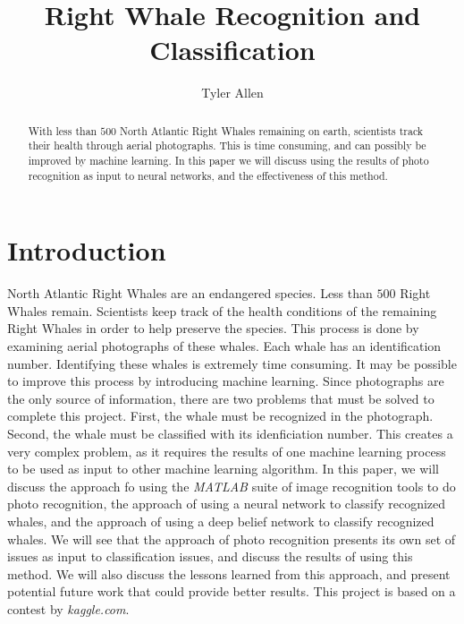 \documentclass[10pt]{IEEEtran}
\newcommand{\?}{\stackrel{?}{=}}
\begin{document}
\title{Right Whale Recognition and Classification}
\date{}
\author{Tyler Allen}
\maketitle


\begin{abstract}
With less than $500$ North Atlantic Right Whales remaining on earth, scientists
track their health through aerial photographs. This is time consuming, and 
can possibly be improved by machine learning. In this paper we will discuss
using the results of photo recognition as input to neural networks,
and the effectiveness of this method. 
\end{abstract}

\section{Introduction}
North Atlantic Right Whales are an endangered species. Less than $500$ Right
Whales remain\cite{kaggle_desc}. Scientists keep track of the health conditions of the remaining
Right Whales in order to help preserve the species. This process is done by
examining aerial photographs of these whales. Each whale has an identification
number\cite{kaggle_desc}. Identifying these whales is extremely time consuming.
It may be possible to improve this process by introducing machine learning. 
Since photographs are the only source of information, there are two problems
that must be solved to complete this project. First, the whale must be recognized
in the photograph. Second, the whale must be classified with its idenficiation
number. This creates a very complex problem, as it requires the results of 
one machine learning process to be used as input to other machine learning
algorithm. In this paper, we will discuss the approach fo using the \textit{MATLAB}
suite of image recognition tools to do photo recognition, the approach of using
a neural network to classify recognized whales, and the approach of using a 
deep belief network to classify recognized whales. We will see that the approach
of photo recognition presents its own set of issues as input to classification
issues, and discuss the results of using this method. We will also discuss the
lessons learned from this approach, and present potential future work that
could provide better results.
This project is based on a contest by \textit{kaggle.com}\cite{kaggle_desc}. 
\end{document}
